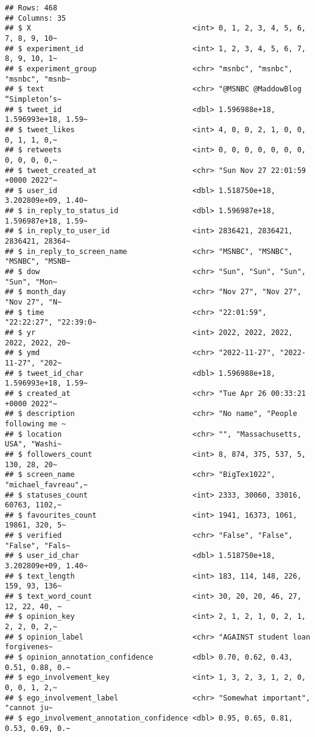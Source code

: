 \documentclass[
]{article}
\begin{document}
\begin{verbatim}
## Rows: 468
## Columns: 35
## $ X                                     <int> 0, 1, 2, 3, 4, 5, 6, 7, 8, 9, 10~
## $ experiment_id                         <int> 1, 2, 3, 4, 5, 6, 7, 8, 9, 10, 1~
## $ experiment_group                      <chr> "msnbc", "msnbc", "msnbc", "msnb~
## $ text                                  <chr> "@MSNBC @MaddowBlog “Simpleton’s~
## $ tweet_id                              <dbl> 1.596988e+18, 1.596993e+18, 1.59~
## $ tweet_likes                           <int> 4, 0, 0, 2, 1, 0, 0, 0, 1, 1, 0,~
## $ retweets                              <int> 0, 0, 0, 0, 0, 0, 0, 0, 0, 0, 0,~
## $ tweet_created_at                      <chr> "Sun Nov 27 22:01:59 +0000 2022"~
## $ user_id                               <dbl> 1.518750e+18, 3.202809e+09, 1.40~
## $ in_reply_to_status_id                 <dbl> 1.596987e+18, 1.596987e+18, 1.59~
## $ in_reply_to_user_id                   <int> 2836421, 2836421, 2836421, 28364~
## $ in_reply_to_screen_name               <chr> "MSNBC", "MSNBC", "MSNBC", "MSNB~
## $ dow                                   <chr> "Sun", "Sun", "Sun", "Sun", "Mon~
## $ month_day                             <chr> "Nov 27", "Nov 27", "Nov 27", "N~
## $ time                                  <chr> "22:01:59", "22:22:27", "22:39:0~
## $ yr                                    <int> 2022, 2022, 2022, 2022, 2022, 20~
## $ ymd                                   <chr> "2022-11-27", "2022-11-27", "202~
## $ tweet_id_char                         <dbl> 1.596988e+18, 1.596993e+18, 1.59~
## $ created_at                            <chr> "Tue Apr 26 00:33:21 +0000 2022"~
## $ description                           <chr> "No name", "People following me ~
## $ location                              <chr> "", "Massachusetts, USA", "Washi~
## $ followers_count                       <int> 8, 874, 375, 537, 5, 130, 28, 20~
## $ screen_name                           <chr> "BigTex1022", "michael_favreau",~
## $ statuses_count                        <int> 2333, 30060, 33016, 60763, 1102,~
## $ favourites_count                      <int> 1941, 16373, 1061, 19861, 320, 5~
## $ verified                              <chr> "False", "False", "False", "Fals~
## $ user_id_char                          <dbl> 1.518750e+18, 3.202809e+09, 1.40~
## $ text_length                           <int> 183, 114, 148, 226, 159, 93, 136~
## $ text_word_count                       <int> 30, 20, 20, 46, 27, 12, 22, 40, ~
## $ opinion_key                           <int> 2, 1, 2, 1, 0, 2, 1, 2, 2, 0, 2,~
## $ opinion_label                         <chr> "AGAINST student loan forgivenes~
## $ opinion_annotation_confidence         <dbl> 0.70, 0.62, 0.43, 0.51, 0.88, 0.~
## $ ego_involvement_key                   <int> 1, 3, 2, 3, 1, 2, 0, 0, 0, 1, 2,~
## $ ego_involvement_label                 <chr> "Somewhat important", "cannot ju~
## $ ego_involvement_annotation_confidence <dbl> 0.95, 0.65, 0.81, 0.53, 0.69, 0.~
\end{verbatim}
\end{document}
